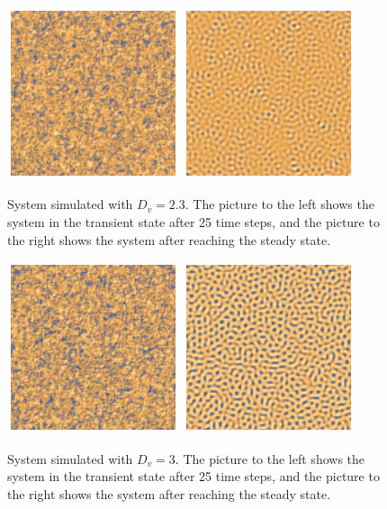 \begin{figure}[h]
    \centering
    \includegraphics[width=0.45\textwidth]{img/2bd23transient.png}
    \includegraphics[width=0.45\textwidth]{img/2bd23.png}
  \caption{System simulated with $D_v=2.3$. The picture to the left shows the system in the transient state after 25 time steps, and the picture to the right shows the system after reaching the steady state.}
\end{figure}

\begin{figure}[h]
    \centering
    \includegraphics[width=0.45\textwidth]{img/2bd3transient.png}
    \includegraphics[width=0.45\textwidth]{img/2bd3.png}
  \caption{System simulated with $D_v=3$. The picture to the left shows the system in the transient state after 25 time steps, and the picture to the right shows the system after reaching the steady state.}
\end{figure}

